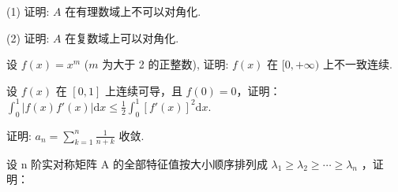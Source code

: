 (1) 证明: $A$ 在有理数域上不可以对角化.\par
(2) 证明: $A$ 在复数域上可以对角化.\par
设 $f(x) = x^{m}$ ($m$ 为大于 2 的正整数), 证明: $f(x)$ 在 $[0, +\infty)$ 上不一致连续.\par
设 $f(x)$ 在 $[0,1]$ 上连续可导，且 $f(0) = 0$，证明：$\int_0^1 |f(x)f'(x)| \mathrm{d}x \leq \frac{1}{2} \int_0^1 [f'(x)]^2 \mathrm{d}x.$\par
证明: $a_{n} = \sum_{k=1}^{n} \frac{1}{n+k}$ 收敛.\par
\par{}
设 n 阶实对称矩阵 A 的全部特征值按大小顺序排列成  $\lambda_{1} \geq \lambda_{2} \geq \cdots \geq \lambda_{n}$ ，证明：\par
\nopagebreak[4]
